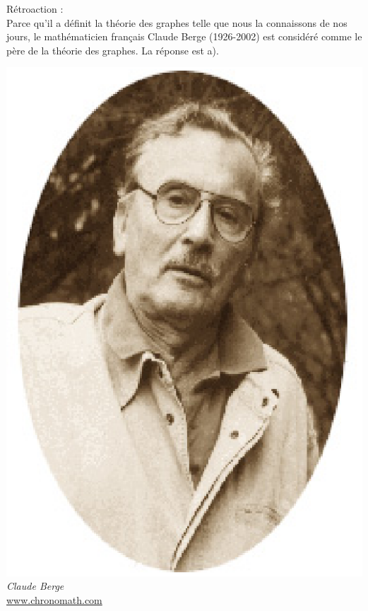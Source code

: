 \documentclass[letterpaper, 12pt]{article}
\begin{document}
R\'etroaction :\\
Parce qu'il a d\'efinit la th\'eorie des graphes telle que nous la connaissons de nos jours, le math\'ematicien fran\c cais Claude Berge (1926-2002) est consid\'er\'e comme le p\`ere de la th\'eorie des graphes. La r\'eponse est a).
\begin{center}
\includegraphics[scale=0.5]{Berge.eps}\\
\emph{{\small Claude Berge}}\\
\href{http://www.chronomath.com/}{www.chronomath.com}\\[5mm]
\end{center}
\end{document}
